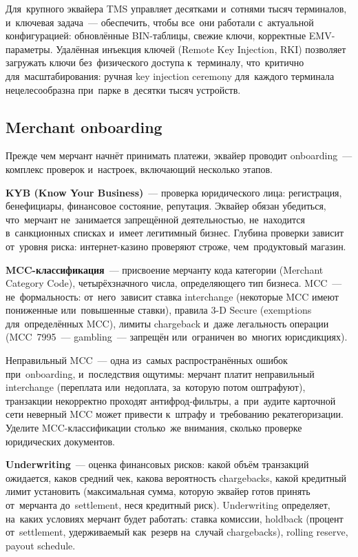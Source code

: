 Для~крупного эквайера TMS управляет десятками и~сотнями тысяч
терминалов, и~ключевая задача~--- обеспечить, чтобы все~они
работали с~актуальной конфигурацией: обновлённые BIN-таблицы,
свежие ключи, корректные EMV-параметры. Удалённая инъекция
ключей (Remote Key Injection, RKI) позволяет загружать ключи
без~физического доступа к~терминалу, что~критично
для~масштабирования: ручная key injection ceremony
для~каждого терминала нецелесообразна при~парке в~десятки
тысяч устройств.

\subsection*{Merchant onboarding}

Прежде чем мерчант начнёт принимать платежи, эквайер проводит
onboarding~--- комплекс проверок и~настроек, включающий
несколько этапов.

\textbf{KYB (Know Your Business)}~--- проверка юридического лица:
регистрация, бенефициары, финансовое состояние, репутация.
Эквайер обязан убедиться, что~мерчант не~занимается запрещённой
деятельностью, не~находится в~санкционных списках и~имеет
легитимный бизнес. Глубина проверки зависит от~уровня риска:
интернет-казино проверяют строже, чем~продуктовый магазин.

\textbf{MCC-классификация}~--- присвоение мерчанту кода
категории (Merchant Category Code), четырёхзначного числа,
определяющего тип бизнеса. MCC~--- не~формальность:
от~него~зависит ставка interchange (некоторые MCC имеют
пониженные или~повышенные ставки), правила 3-D Secure
(exemptions для~определённых MCC), лимиты chargeback
и~даже легальность операции (MCC~7995~--- gambling~---
запрещён или~ограничен во~многих юрисдикциях).

\begin{practice}
  Неправильный MCC~--- одна из~самых распространённых ошибок
  при~onboarding, и~последствия ощутимы: мерчант платит
  неправильный interchange (переплата или~недоплата,
  за~которую потом оштрафуют), транзакции некорректно
  проходят антифрод-фильтры, а~при~аудите карточной сети
  неверный MCC может привести к~штрафу и~требованию
  рекатегоризации. Уделите MCC-классификации столько~же
  внимания, сколько проверке юридических документов.
\end{practice}

\textbf{Underwriting}~--- оценка финансовых рисков: какой объём
транзакций ожидается, каков средний чек, какова вероятность
chargebacks, какой кредитный лимит установить (максимальная
сумма, которую эквайер готов принять от~мерчанта до~settlement,
неся кредитный риск). Underwriting определяет, на~каких
условиях мерчант будет работать: ставка комиссии, holdback
(процент от~settlement, удерживаемый как~резерв на~случай
chargebacks), rolling reserve, payout schedule.

